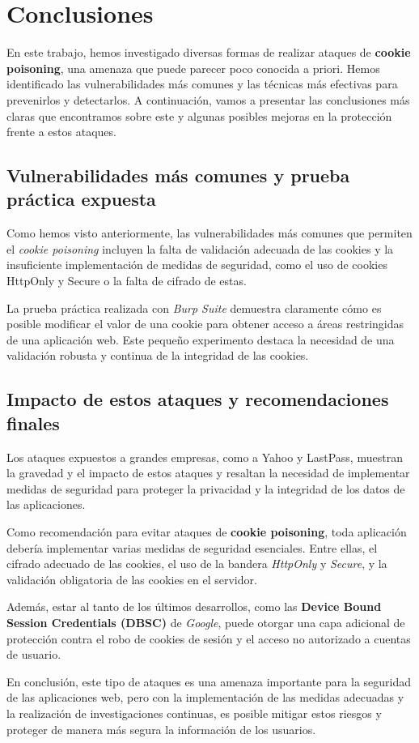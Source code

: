 \section{Conclusiones}


En este trabajo, hemos investigado diversas formas de realizar ataques de \textbf{cookie poisoning}, una amenaza que puede parecer poco conocida a priori. Hemos identificado las vulnerabilidades más comunes y las técnicas más efectivas para prevenirlos y detectarlos. A continuación, vamos a presentar las conclusiones más claras que encontramos sobre este y algunas posibles mejoras en la protección frente a estos ataques.


\subsection*{Vulnerabilidades más comunes y prueba práctica expuesta}

Como hemos visto anteriormente, las vulnerabilidades más comunes que permiten el \textit{cookie poisoning} incluyen la falta de validación adecuada de las cookies y la insuficiente implementación de medidas de seguridad, como el uso de cookies HttpOnly y Secure o la falta de cifrado de estas. 

La prueba práctica realizada con \textit{Burp Suite} demuestra claramente cómo es posible modificar el valor de una cookie para obtener acceso a áreas restringidas de una aplicación web. Este pequeño experimento destaca la necesidad de una validación robusta y continua de la integridad de las cookies.

\subsection*{Impacto de estos ataques y recomendaciones finales}

Los ataques expuestos a grandes empresas, como a Yahoo y LastPass, muestran la gravedad y el impacto de estos ataques y resaltan la necesidad de implementar medidas de seguridad para proteger la privacidad y la integridad de los datos de las aplicaciones.

Como recomendación para evitar ataques de \textbf{cookie poisoning}, toda aplicación debería implementar varias medidas de seguridad esenciales. Entre ellas, el cifrado adecuado de las cookies, el uso de la bandera \textit{HttpOnly} y \textit{Secure}, y la validación obligatoria de las cookies en el servidor.

Además, estar al tanto de los últimos desarrollos, como las \textbf{Device Bound Session Credentials (DBSC)} de \textit{Google}, puede otorgar una capa adicional de protección contra el robo de cookies de sesión y el acceso no autorizado a cuentas de usuario.


En conclusión, este tipo de ataques es una amenaza importante para la seguridad de las aplicaciones web, pero con la implementación de las medidas adecuadas y la realización de investigaciones continuas, es posible mitigar estos riesgos y proteger de manera más segura la información de los usuarios.

